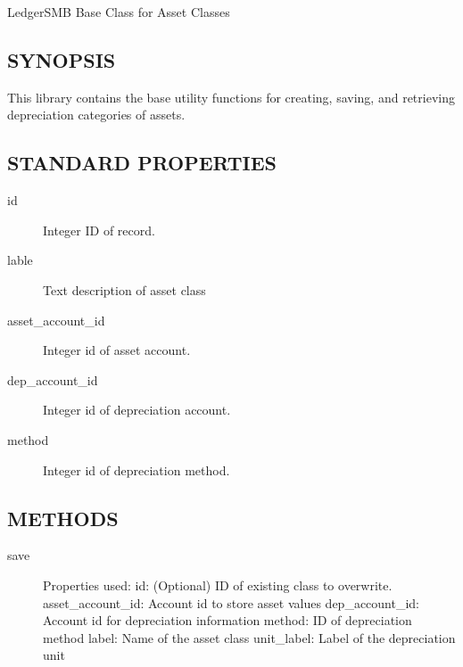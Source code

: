 \begin{description}
\begin{description}
\begin{description}
\begin{description}
\begin{description}
\begin{description}
\begin{description}
\begin{description}
\begin{description}
\begin{description}
LedgerSMB Base Class for Asset Classes

\subsection*{SYNOPSIS\label{LedgerSMB::DBObject::Asset_Class_SYNOPSIS}}


This library contains the base utility functions for creating, saving, and
retrieving depreciation categories of assets.

\subsection*{STANDARD PROPERTIES\label{LedgerSMB::DBObject::Asset_Class_STANDARD_PROPERTIES}}
\begin{description}

\item[{id}] \mbox{}

Integer ID of record.


\item[{lable}] \mbox{}

Text description of asset class


\item[{asset\_account\_id}] \mbox{}

Integer id of asset account.


\item[{dep\_account\_id}] \mbox{}

Integer id of depreciation account.


\item[{method}] \mbox{}

Integer id of depreciation method.

\end{description}
\subsection*{METHODS\label{LedgerSMB::DBObject::Asset_Class_METHODS}}
\begin{description}

\item[{save}] \mbox{}

Properties used:
id:  (Optional) ID of existing class to overwrite. 
asset\_account\_id: Account id to store asset values
dep\_account\_id: Account id for depreciation information 
method:  ID of depreciation method
label:  Name of the asset class
unit\_label:  Label of the depreciation unit




\end{description}
\end{description}
\end{description}
\end{description}
\end{description}
\end{description}
\end{description}
\end{description}
\end{description}
\end{description}
\end{description}
